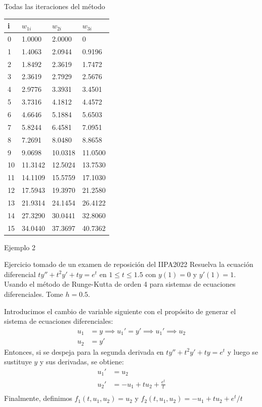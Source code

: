 \begin{frame}{Todas las iteraciones del método}
\begin{table}[]
\renewcommand{\arraystretch}{1.5}
\begin{tabular}{|l|l|l|l|}
\hline
\textbf{i} & \textbf{$w_{1i}$} & \textbf{$w_{2i}$} & \textbf{$w_{3i}$} \\ \hline
0 & 1.0000 & 2.0000 & 0 \\ \hline
1 & 1.4063 & 2.0944 & 0.9196 \\ \hline
2 & 1.8492 & 2.3619 & 1.7472 \\ \hline
3 & 2.3619 & 2.7929 & 2.5676 \\ \hline
4 & 2.9776 & 3.3931 & 3.4501 \\ \hline
5 & 3.7316 & 4.1812 & 4.4572 \\ \hline
6 & 4.6646 & 5.1884 & 5.6503 \\ \hline
7 & 5.8244 & 6.4581 & 7.0951 \\ \hline
8 & 7.2691 & 8.0480 & 8.8658 \\ \hline
9 & 9.0698 & 10.0318 & 11.0500 \\ \hline
10 & 11.3142 & 12.5024 & 13.7530 \\ \hline
11 & 14.1109 & 15.5759 & 17.1030 \\ \hline
12 & 17.5943 & 19.3970 & 21.2580 \\ \hline
13 & 21.9314 & 24.1454 & 26.4122 \\ \hline
14 & 27.3290 & 30.0441 & 32.8060 \\ \hline
15 & 34.0440 & 37.3697 & 40.7362 \\ \hline
\end{tabular}
\end{table}
\end{frame}

\begin{frame}{Ejemplo 2}
\begin{block}{Ejercicio tomado de un examen de reposición del IIPA2022}
Resuelva la ecuación diferencial 
$ty''+t^2y'+ty=e^t$ en  $1\leq t \leq 1.5$ con $y(1)=0$ y $y'(1)=1$. Usando el método de Runge-Kutta de orden 4 para sistemas de ecuaciones diferenciales. Tome $h=0.5$.
\end{block}

Introducimos el cambio de variable siguiente con el propósito de generar el sistema de ecuaciones diferenciales:
\begin{align*}
u_1 &=y\implies u_1'=y'\implies u_1'\implies u_2\\
u_2 &=y'
\end{align*}
Entonces, si se despeja para la segunda derivada en $ty''+t^2y'+ty=e^t$ y luego se sustituye $y$ y sus derivadas, se obtiene:
\begin{align*}
u_1' &= u_2\\
u_2' &= -u_1+tu_2+\frac{e^t}{t}\\
\end{align*}
Finalmente, definimos $f_1(t, u_1, u_2)=u_2$ y $f_2(t, u_1, u_2)=-u_1+tu_2+e^t/t$ 
\end{frame}


